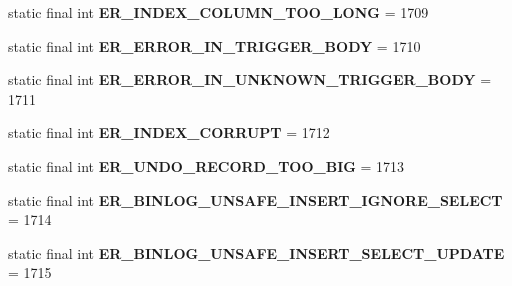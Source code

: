 \begin{DoxyCompactItemize}
static final int {\bfseries E\+R\+\_\+\+I\+N\+D\+E\+X\+\_\+\+C\+O\+L\+U\+M\+N\+\_\+\+T\+O\+O\+\_\+\+L\+O\+NG} = 1709
\item 
\mbox{\label{classcom_1_1mysql_1_1jdbc_1_1_mysql_error_numbers_a5ef6273aaa53011114e469a6d1b41a40}} 
static final int {\bfseries E\+R\+\_\+\+E\+R\+R\+O\+R\+\_\+\+I\+N\+\_\+\+T\+R\+I\+G\+G\+E\+R\+\_\+\+B\+O\+DY} = 1710
\item 
\mbox{\label{classcom_1_1mysql_1_1jdbc_1_1_mysql_error_numbers_ab0aad907fbbef757c33ec2de780943c0}} 
static final int {\bfseries E\+R\+\_\+\+E\+R\+R\+O\+R\+\_\+\+I\+N\+\_\+\+U\+N\+K\+N\+O\+W\+N\+\_\+\+T\+R\+I\+G\+G\+E\+R\+\_\+\+B\+O\+DY} = 1711
\item 
\mbox{\label{classcom_1_1mysql_1_1jdbc_1_1_mysql_error_numbers_aeb87df464eafffcf4c9ae40f5cb48d0a}} 
static final int {\bfseries E\+R\+\_\+\+I\+N\+D\+E\+X\+\_\+\+C\+O\+R\+R\+U\+PT} = 1712
\item 
\mbox{\label{classcom_1_1mysql_1_1jdbc_1_1_mysql_error_numbers_a4876fefce9af4816790f4926b020a0a5}} 
static final int {\bfseries E\+R\+\_\+\+U\+N\+D\+O\+\_\+\+R\+E\+C\+O\+R\+D\+\_\+\+T\+O\+O\+\_\+\+B\+IG} = 1713
\item 
\mbox{\label{classcom_1_1mysql_1_1jdbc_1_1_mysql_error_numbers_a499eb828c8c4d51bd88ff577fa54d37f}} 
static final int {\bfseries E\+R\+\_\+\+B\+I\+N\+L\+O\+G\+\_\+\+U\+N\+S\+A\+F\+E\+\_\+\+I\+N\+S\+E\+R\+T\+\_\+\+I\+G\+N\+O\+R\+E\+\_\+\+S\+E\+L\+E\+CT} = 1714
\item 
\mbox{\label{classcom_1_1mysql_1_1jdbc_1_1_mysql_error_numbers_a14e7e1cea459d82ecf9a8643baea2af6}} 
static final int {\bfseries E\+R\+\_\+\+B\+I\+N\+L\+O\+G\+\_\+\+U\+N\+S\+A\+F\+E\+\_\+\+I\+N\+S\+E\+R\+T\+\_\+\+S\+E\+L\+E\+C\+T\+\_\+\+U\+P\+D\+A\+TE} = 1715
\item 
\mbox{\label{classcom_1_1mysql_1_1jdbc_1_1_mysql_error_numbers_a04ed7d0c4a85586e74d15fd8c2c26ad8}} 

\end{DoxyCompactItemize}
